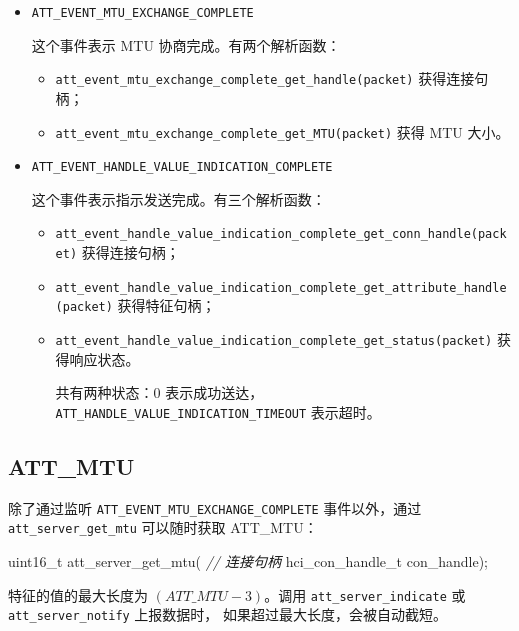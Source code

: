 \documentclass[
  12pt,
]{book}
\newenvironment{Shaded}{\begin{snugshade}}{\end{snugshade}}
\newcommand{\CommentTok}[1]{\textcolor[rgb]{0.56,0.35,0.01}{\textit{#1}}}
\newcommand{\DataTypeTok}[1]{\textcolor[rgb]{0.13,0.29,0.53}{#1}}
\newcommand{\NormalTok}[1]{#1}
\providecommand{\tightlist}{%
  \setlength{\itemsep}{0pt}\setlength{\parskip}{0pt}}
\begin{document}
\begin{itemize}
\item
  \texttt{ATT\_EVENT\_MTU\_EXCHANGE\_COMPLETE}

  这个事件表示 MTU 协商完成。有两个解析函数：

  \begin{itemize}
  \tightlist
  \item
    \texttt{att\_event\_mtu\_exchange\_complete\_get\_handle(packet)}
    获得连接句柄；
  \item
    \texttt{att\_event\_mtu\_exchange\_complete\_get\_MTU(packet)}
    获得 MTU 大小。
  \end{itemize}
\item
  \texttt{ATT\_EVENT\_HANDLE\_VALUE\_INDICATION\_COMPLETE}

  这个事件表示指示发送完成。有三个解析函数：

  \begin{itemize}
  \item
    \texttt{att\_event\_handle\_value\_indication\_complete\_get\_conn\_handle(packet)}
    获得连接句柄；
  \item
    \texttt{att\_event\_handle\_value\_indication\_complete\_get\_attribute\_handle(packet)}
    获得特征句柄；
  \item
    \texttt{att\_event\_handle\_value\_indication\_complete\_get\_status(packet)}
    获得响应状态。

    共有两种状态：\(0\) 表示成功送达，\texttt{ATT\_HANDLE\_VALUE\_INDICATION\_TIMEOUT} 表示超时。
  \end{itemize}
\end{itemize}

\hypertarget{att_mtu}{%
\subsection{ATT\_MTU}\label{att_mtu}}

除了通过监听 \texttt{ATT\_EVENT\_MTU\_EXCHANGE\_COMPLETE} 事件以外，通过 \texttt{att\_server\_get\_mtu} 可以随时获取 ATT\_MTU：

\begin{Shaded}
\begin{Highlighting}[]
\DataTypeTok{uint16_t}\NormalTok{ att_server_get_mtu(}
  \CommentTok{// 连接句柄}
\NormalTok{  hci_con_handle_t con_handle);}
\end{Highlighting}
\end{Shaded}

特征的值的最大长度为 \((ATT\_MTU - 3)\)。调用 \texttt{att\_server\_indicate} 或 \texttt{att\_server\_notify} 上报数据时，
如果超过最大长度，会被自动截短。
\end{document}

